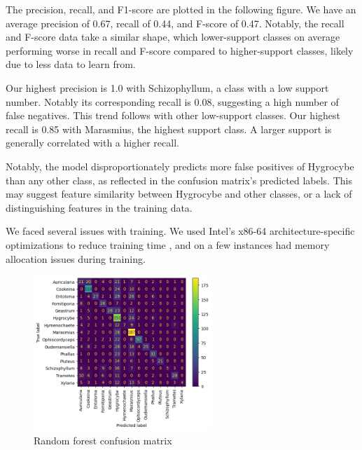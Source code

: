 \documentclass{article} %
\begin{document}
The precision, recall, and F1-score are plotted in the following figure. We have an average precision of 0.67, recall of 0.44, and F-score of 0.47. Notably, the recall and F-score data take a similar shape, which lower-support classes on average performing worse in recall and F-score compared to higher-support classes, likely due to less data to learn from.

Our highest precision is 1.0 with Schizophyllum, a class with a low support number. Notably its corresponding recall is 0.08, suggesting a high number of false negatives. This trend follows with other low-support classes. Our highest recall is 0.85 with Marasmius, the highest support class. A larger support is generally correlated with a higher recall.

Notably, the model disproportionately predicts more false positives of Hygrocybe than any other class, as reflected in the confusion matrix's predicted labels. This may suggest feature similarity between Hygrocybe and other classes, or a lack of distinguishing features in the training data.

We faced several issues with training. We used Intel's x86-64 architecture-specific optimizations to reduce training time \citep{SchlimbachAndreevEtAl.IntelExtensionScikitlearn.2023}, and on a few instances had memory allocation issues during training.

\begin{figure}[h]
    \begin{center}
    \includegraphics[width=0.6\textwidth]{figures/baseline_matrix.png}
    \end{center}
    \caption{Random forest confusion matrix}
\end{figure}
\end{document}
